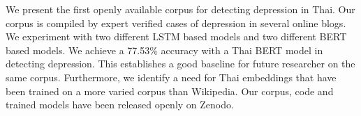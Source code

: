 We present the first openly available corpus for detecting depression in Thai. Our corpus is compiled by expert verified cases of depression in several online blogs. We experiment with two different LSTM based models and two different BERT based models. We achieve a 77.53\% accuracy with a Thai BERT model in detecting depression. This establishes a good baseline for future researcher on the same corpus. Furthermore, we identify a need for Thai embeddings that have been trained on a more varied corpus than Wikipedia. Our corpus, code and trained models have been released openly on Zenodo.
